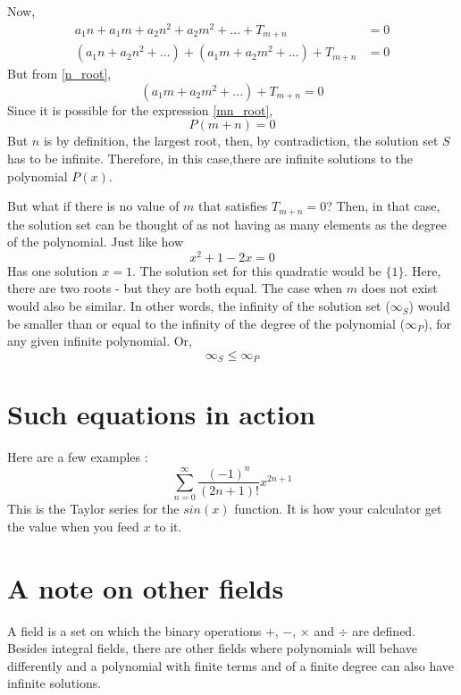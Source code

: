 \documentclass[preprint,12pt]{elsarticle}
\begin{document}
Now, 
\begin{align*}
    a_1n + a_1m + a_2n^2 + a_2m^2 + ... + T_{m+n} &= 0\\
    (a_1n + a_2n^2 + ...) + (a_1m + a_2m^2 + ...) + T_{m+n} &= 0
\end{align*}
But from \ref{n_root}, 
\begin{equation} \label{mn_root}
    (a_1m + a_2m^2 + ...) + T_{m+n} = 0
\end{equation}
Since it is possible for the expression \ref{mn_root}, 
\[P(m+n)=0\]
But $n$ is by definition, the largest root, then, by contradiction, the solution set $S$ has to be infinite.
Therefore, in this case,there are infinite solutions to the polynomial $P(x)$.

But what if there is no value of $m$ that satisfies $T_{m+n}=0$? Then, in that case, the solution set can be thought of as not having as many elements as the degree of the polynomial.
Just like how 
\[
    x^2 + 1 - 2x = 0
\]
Has one solution $x=1$.
The solution set for this quadratic would be $\{1\}$.
Here, there are two roots - but they are both equal. The case when $m$ does not exist would also be similar.
In other words, the infinity of the solution set ($\infty_{S}$) would be smaller than or equal to the infinity of the degree of the polynomial ($\infty_{P}$), for any given infinite polynomial.
Or,
\begin{equation}
    \infty_{S} \leqslant \infty_{P}
\end{equation}
\section{Such equations in action}
Here are a few examples :
\[
\sum_{n=0}^{\infty} \dfrac{(-1)^n}{(2n+1)!} x^{2n+1}
\]
This is the Taylor series for the $sin(x)$ function. It is how your calculator get the value when you feed $x$ to it.
\section*{A note on other fields}
A field is a set on which the binary operations $+$, $-$, $\times$ and $\div$ are defined.
Besides integral fields, there are other fields where polynomials will behave differently and a polynomial with finite terms and of a finite degree can also have infinite solutions.

\end{document}
